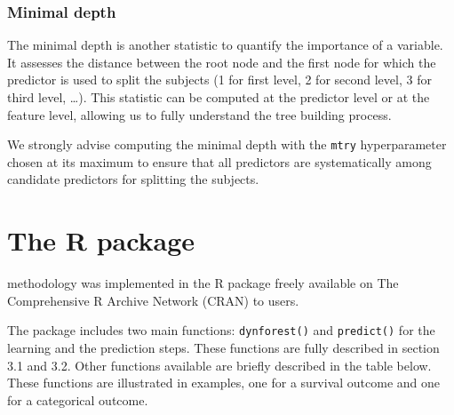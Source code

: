 \subsubsection{Minimal depth}\label{minimal-depth}

The minimal depth is another statistic to quantify the importance of a variable. It assesses the distance between the root node and the first node for which the predictor is used to split the subjects (1 for first level, 2 for second level, 3 for third level, \ldots). This statistic can be computed at the predictor level or at the feature level, allowing us to fully understand the tree building process.

We strongly advise computing the minimal depth with the \texttt{mtry} hyperparameter chosen at its maximum to ensure that all predictors are systematically among candidate predictors for splitting the subjects.

\section{\texorpdfstring{The  R package}{The  R package}}\label{the-r-package}

 methodology was implemented in the R package  \citep{devaux_dynforest_2024} freely available on The Comprehensive R Archive Network (CRAN) to users.

The package includes two main functions: \texttt{dynforest()} and \texttt{predict()} for the learning and the prediction steps. These functions are fully described in section 3.1 and 3.2. Other functions available are briefly described in the table below. These functions are illustrated in examples, one for a survival outcome and one for a categorical outcome.

